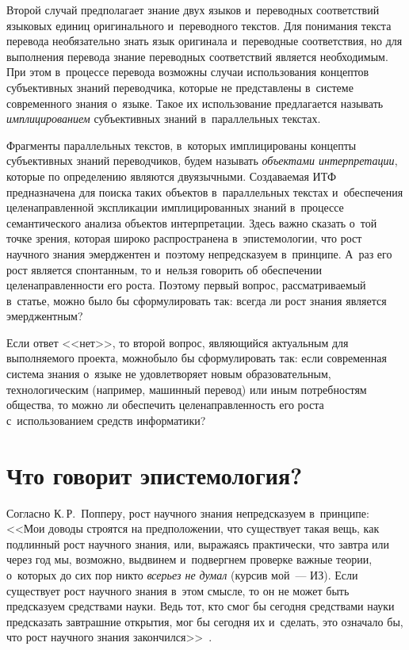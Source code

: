 \begin{multicols}{2}
Второй случай предполагает знание 
двух языков и~переводных соответствий языковых единиц оригинального 
и~переводного текс\-тов. Для понимания текс\-та перевода необязательно знать 
язык оригинала и~переводные соответствия, но для выполнения перевода 
знание переводных соответствий является необходимым. При этом в~процессе 
перевода возможны случаи использования концептов субъективных знаний 
переводчика, которые не представлены в~сис\-те\-ме современного знания о~языке. 
Такое их использование предлагается называть \textit{имплицированием} 
субъективных знаний в~параллельных текстах.
  
  Фрагменты параллельных текстов, в~которых имплицированы концепты 
субъективных знаний переводчиков, будем называть \textit{объектами 
интерпретации}, которые по определению являются двуязычными. 
Создаваемая ИТФ предназначена для поиска таких объектов в~параллельных 
текстах и~обеспечения целенаправленной экспликации имплицированных 
знаний в~процессе семантического анализа объектов интерпретации. Здесь 
важно сказать о~той точке зрения, которая широко распространена 
в~эпистемологии, что рост научного знания эмерджентен и~поэтому 
непредсказуем в~принципе. А~раз его рост является спонтанным, то и~нельзя 
говорить об обеспечении целенаправленности его роста. Поэтому первый 
вопрос, рассматриваемый в~статье, можно было бы сформулировать так: всегда 
ли рост знания является эмерджентным?
  
  Если ответ <<нет>>, то второй вопрос, являющийся актуальным для 
выполняемого проекта, можно\linebreak было бы сформулировать так: если современная 
сис\-те\-ма знания о~языке не удовлетворяет новым образовательным, 
технологическим (например, машинный перевод) или иным потребностям 
общества, то можно ли обеспечить целенаправленность его роста 
с~использованием средств информатики?

\vspace*{-6pt}
  
\section{Что говорит эпистемология?}

\vspace*{-2pt}
    
  Согласно К.\,Р.~Попперу, рост научного знания непредсказуем в~принципе: 
<<Мои доводы строятся на предположении, что существует такая вещь, как 
подлинный рост научного знания, или, выражаясь практически, что завтра или 
через год мы, возможно, выдвинем и~подвергнем проверке важные теории, 
о~которых до сих пор никто \textit{всерьез не думал} (курсив мой~--- ИЗ). Если 
существует рост научного знания в~этом смысле, то он не может быть 
предсказуем средствами науки. Ведь тот, кто смог бы сегодня средствами науки 
предсказать завтрашние открытия, мог бы сегодня их и~сделать, это означало 
бы, что рост научного знания закончился>>~\cite[с.~283]{1-zat}.
  

\end{multicols}
